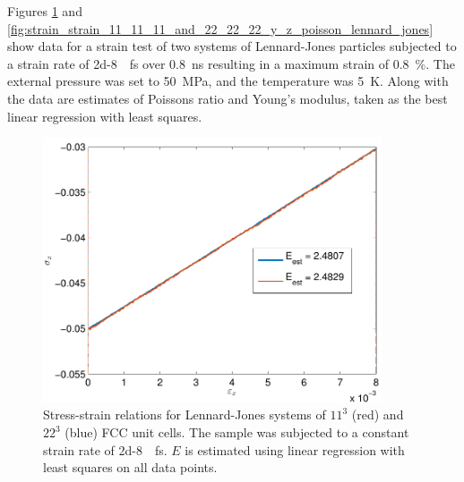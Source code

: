 Figures \ref{fig:stress_strain_11_11_11_and_22_22_22_y_z_poisson_lennard_jones} and \ref{fig:strain_strain_11_11_11_and_22_22_22_y_z_poisson_lennard_jones} show data for a strain test of two systems of Lennard-Jones particles subjected to a strain rate of \SI{2d-8}{\per\femto\second} over \SI{0.8}{\nano\second} resulting in a maximum strain of \SI{0.8}{\percent}. The external pressure was set to \SI{50}{\mega\pascal}, and the temperature was \SI{5}{\kelvin}. Along with the data are estimates of Poissons ratio and Young's modulus, taken as the best linear regression with least squares. 


\begin{figure}
\centering
\includegraphics[width=10cm]{../figures/thesis/stress_strain_11_11_11_and_22_22_22_y_z_poisson_lennard_jones.pdf}
\caption{Stress-strain relations for Lennard-Jones systems of $11^3$ (red) and $22^3$ (blue) FCC unit cells. The sample was subjected to a constant strain rate of \SI{2d-8}{\per\femto\second}. $E$ is estimated using linear regression with least squares on all data points.}
\label{fig:stress_strain_11_11_11_and_22_22_22_y_z_poisson_lennard_jones}
\end{figure}

